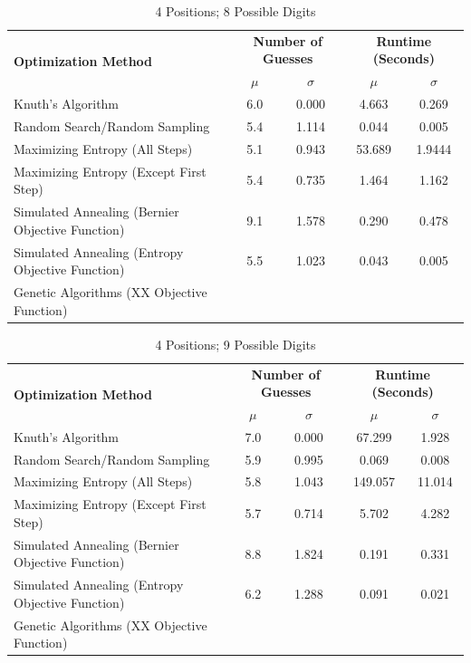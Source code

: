 \documentclass[11pt]{article}
\begin{document}
\begin{table}[h!]
\begin{center}
\begin{tabular}{l c c c c}
\toprule
\multirow{2}{*}{\bfseries Optimization Method} 		& \multicolumn{2}{c}{\bfseries Number of Guesses} 		& \multicolumn{2}{c}{\bfseries Runtime (Seconds)}	\\
\cmidrule(lr){2-3}  \cmidrule(lr){4-5}				& $\mu$ & $\sigma$								& $\mu$ & $\sigma$							\\
\cmidrule(lr){1-5}
Knuth's Algorithm							& 6.0 & 0.000									& 4.663 & 0.269							\\
Random Search/Random Sampling				& 5.4 & 1.114									& 0.044 & 0.005							\\
Maximizing Entropy (All Steps)					& 5.1 & 0.943									& 53.689 & 1.9444							\\
Maximizing Entropy (Except First Step)			& 5.4 & 0.735									& 1.464 & 1.162							\\
Simulated Annealing (Bernier Objective Function)	& 9.1 & 1.578									& 0.290 & 0.478							\\
Simulated Annealing (Entropy Objective Function)	& 5.5 & 1.023									& 0.043 & 0.005							\\
Genetic Algorithms (XX Objective Function)		& &											& &										\\
\bottomrule
\end{tabular}
\end{center}
\caption{4 Positions; 8 Possible Digits}
\label{fig:compare_4_8}
\end{table}

\begin{table}[h!]
\begin{center}
\begin{tabular}{l c c c c}
\toprule
\multirow{2}{*}{\bfseries Optimization Method} 		& \multicolumn{2}{c}{\bfseries Number of Guesses} 		& \multicolumn{2}{c}{\bfseries Runtime (Seconds)}	\\
\cmidrule(lr){2-3}  \cmidrule(lr){4-5}				& $\mu$ & $\sigma$								& $\mu$ & $\sigma$							\\
\cmidrule(lr){1-5}
Knuth's Algorithm							& 7.0 & 0.000									& 67.299 & 1.928							\\
Random Search/Random Sampling				& 5.9 & 0.995									& 0.069 & 0.008							\\
Maximizing Entropy (All Steps)					& 5.8 & 1.043									& 149.057 & 11.014							\\
Maximizing Entropy (Except First Step)			& 5.7 & 0.714									& 5.702 & 4.282							\\
Simulated Annealing (Bernier Objective Function)	& 8.8 & 1.824									& 0.191 & 0.331							\\
Simulated Annealing (Entropy Objective Function)	& 6.2 & 1.288									& 0.091 & 0.021							\\
Genetic Algorithms (XX Objective Function)		& &											& &										\\
\bottomrule
\end{tabular}
\end{center}
\caption{4 Positions; 9 Possible Digits}
\label{fig:compare_4_9}
\end{table}
\end{document}
